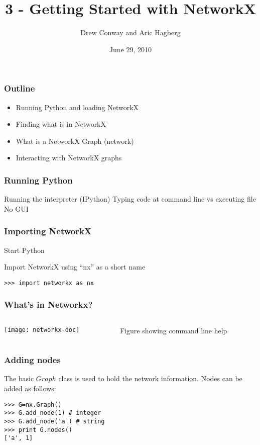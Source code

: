 \documentclass[xcolor=dvipsnames, 9pt]{beamer}
\title{3 - Getting Started with NetworkX}
\author{Drew Conway and Aric Hagberg}
\date{June 29, 2010}
\begin{document}
\begin{frame}[plain]
\titlepage
\end{frame}

\begin{frame}
\frametitle{Outline}
\begin{itemize}
\item Running Python and loading NetworkX
\item Finding what is in NetworkX
\item What is a NetworkX Graph (network)
\item Interacting with NetworkX graphs
\end{itemize}
\end{frame}

\begin{frame}
\frametitle{Running Python}
Running the interpreter (IPython)
Typing code at command line vs executing file
No GUI
\end{frame}


\begin{frame}[fragile]
\frametitle{Importing NetworkX}
Start Python

Import NetworkX using ``nx'' as a short name
\begin{block}{}
\begin{verbatim}
>>> import networkx as nx 
\end{verbatim}
\end{block}

\end{frame}

\begin{frame}
\frametitle{What's in Networkx?}
\begin{columns}[T]
\begin{column}{0.5\textwidth}
\centerline{\texttt{[image: networkx-doc]}}
\end{column}
\begin{column}{0.5\textwidth}
Figure showing command line help
\end{column}
\end{columns}
\end{frame}



\begin{frame}[fragile]
\frametitle{Adding nodes}

The basic $Graph$ class is used to hold the network information.
Nodes can be added as follows:
\begin{block}{}
\begin{verbatim}
>>> G=nx.Graph()
>>> G.add_node(1) # integer
>>> G.add_node('a') # string
>>> print G.nodes()
['a', 1]
\end{verbatim}
\end{block}

\end{frame}
\end{document}
